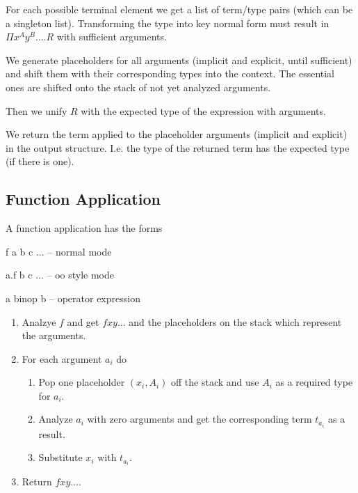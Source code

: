 For each possible terminal element we get a list of term/type pairs (which can
be a singleton list). Transforming the type into key normal form must result
in $\Pi x^A y^B \ldots . R$ with sufficient arguments.

We generate placeholders for all arguments (implicit and explicit, until
sufficient) and shift them with their corresponding types into the
context. The essential ones are shifted onto the stack of not yet analyzed
arguments.

Then we unify $R$ with the expected type of the expression with arguments.

We return the term applied to the placeholder arguments (implicit and
explicit) in the output structure. I.e. the type of the returned term has the
expected type (if there is one).




\subsection{Function Application}

A function application has the forms

\begin{alba}
  f a b c ...        -- normal mode

  a.f b c ...        -- oo style mode

  a binop b          -- operator expression
\end{alba}


\begin{enumerate}

\item Analzye $f$ and get $f x y \ldots$ and the placeholders on the stack
  which represent the arguments.


\item For each argument $a_i$ do
  \begin{enumerate}

  \item Pop one placeholder $(x_i,A_i)$ off the stack and use $A_i$ as a
    required type for $a_i$.

  \item Analyze $a_i$ with zero arguments and get the corresponding term
    $t_{a_i}$ as a result.

  \item Substitute $x_i$ with $t_{a_i}$.

  \end{enumerate}

\item Return $f x y \ldots$.

\end{enumerate}






